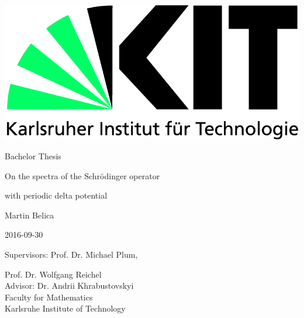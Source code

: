 \begin{titlepage}
  \includegraphics[scale=0.45]{kit-logo.jpg}
  \vspace*{1cm} 

  \begin{center} \large 
    
    Bachelor Thesis
    \vspace*{1.5cm}

    {\huge On the spectra of the Schrödinger operator}
     \vspace{-0.45cm}
     
    {\huge with periodic delta potential}
    \vspace*{2cm}

    Martin Belica
    \vspace{-0.5cm}

    2016-09-30
    \vspace*{3.5cm}


    Supervisors: Prof. Dr. Michael Plum,
    \vspace{-0.5cm}
    
    Prof. Dr. Wolfgang Reichel \\[1cm]
    Advisor: Dr. Andrii Khrabustovskyi \\[1cm]
    Faculty for Mathematics \\[1cm]
	Karlsruhe Institute of Technology
  \end{center}
\end{titlepage}